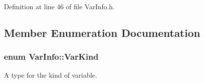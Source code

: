 Definition at line 46 of file Var\-Info.\-h.



\subsection{Member Enumeration Documentation}
\hypertarget{classVarInfo_a64d1da76cf84fe674e5fef9764ef11cf}{
\subsubsection[{Var\-Kind}]{\setlength{\rightskip}{0pt plus 5cm}enum {\bf Var\-Info\-::\-Var\-Kind}}}\label{classVarInfo_a64d1da76cf84fe674e5fef9764ef11cf}


A type for the kind of variable. 

